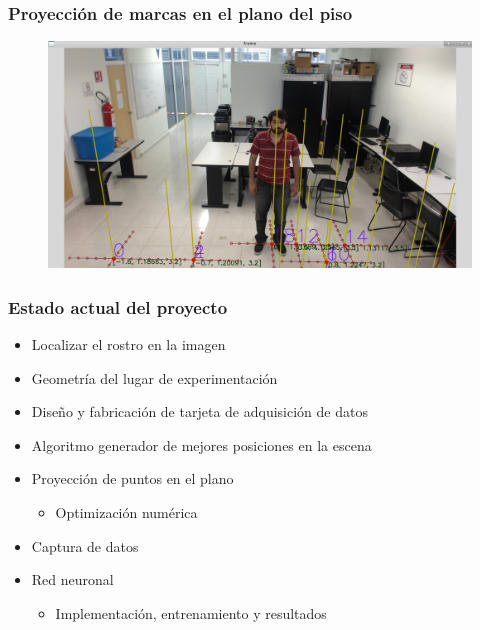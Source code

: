 \documentclass[10pt, compress]{beamer}
\begin{document}
\begin{frame}[fragile]
	\frametitle{Proyección de marcas en el plano del piso}
	\begin{figure}[htbp]
		\includegraphics[width=1\textwidth]{./pictures/marcasPiso}
	\end{figure}	
\end{frame}

\begin{frame}[fragile]
	\frametitle{Estado actual del proyecto}
	\begin{itemize}
		\item Localizar el rostro en la imagen
		\item Geometría del lugar de experimentación
		\item Diseño y fabricación de tarjeta de adquisición de datos
		\item Algoritmo generador de mejores posiciones en la escena
		\item Proyección de puntos en el plano
		\begin{itemize}
			\item Optimización numérica
		\end{itemize}
		\item {\color{red}Captura de datos}
		\item Red neuronal
		\begin{itemize}
			\item Implementación, entrenamiento y resultados
		\end{itemize}
	\end{itemize}
	
\end{frame}
\end{document}
